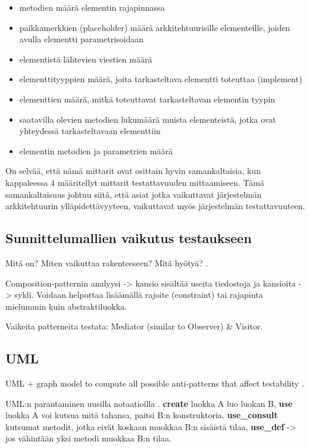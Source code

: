 \documentclass[finnish]{tktltiki2}
\theoremstyle{definition}
\theoremstyle{remark}
\begin{document}
\begin{itemize}
	\item metodien määrä elementin rajapinnassa
	\item paikkamerkkien (placeholder) määrä arkkitehtuurisille elementeille, joiden avulla elementti parametrisoidaan
	\item elementistä lähtevien viestien määrä
	\item elementtityyppien määrä, joita tarkasteltava elementti toteuttaa (implement)
	\item elementtien määrä, mitkä toteuttavat tarkasteltavan elementin tyypin
	\item saatavilla olevien metodien lukumäärä muista elementeistä, jotka ovat yhteydessä tarkasteltavaan elementtiin
	\item elementin metodien ja parametrien määrä
\end{itemize}

On selvää, että nämä mittarit ovat osittain hyvin samankaltaisia, kun kappaleessa 4 määritellyt mittarit testattavuuden mittaamiseen. Tämä samankaltaisuus johtuu siitä, että asiat jotka vaikuttavat järjestelmän arkkitehtuurin ylläpidettävyyteen, vaikuttavat myös järjestelmän testattavuuteen.


\subsection{Sunnittelumallien vaikutus testaukseen}

Mitä on? Miten vaikuttaa rakenteeseen? Mitä  hyötyä? \citep{baudry_measuring_2003}.

Composition-patternin analyysi -> kansio sisältää useita tiedostoja ja kansioita -> sykli. Voidaan helpottaa lisäämällä rajoite (constraint) tai rajapinta mielummin kuin abstraktiluokka. 

Vaikeita patterneita testata: Mediator (similar to Observer) \& Visitor.

\subsection{UML}

UML + graph model to compute all possible anti-patterns that affect testability \citep{baudry_testability_2002}.

UML:n parantaminen uusilla notaatioilla \citep[s. 4]{baudry_measuring_2003}. \textbf{create}  luokka A luo luokan B, \textbf{use}  luokka A voi kutsua mitä tahansa, paitsi B:n konstruktoria. \textbf{use\_consult}  kutsumat metodit, jotka eivät koskaan muokkaa B:n sisäistä tilaa, \textbf{use\_def} -> jos vähintään yksi metodi muokkaa B:n tilaa.
\end{document}
